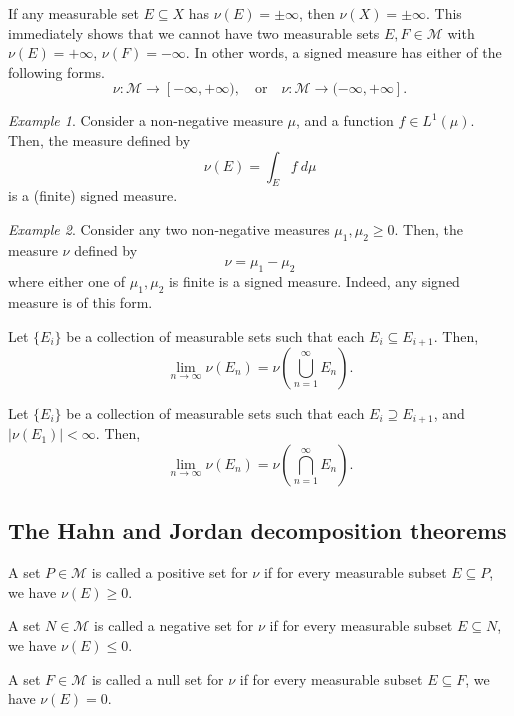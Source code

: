\documentclass[11pt]{article}
\newcommand{\M}{\mathcal{M}}
\theoremstyle{definition}
\theoremstyle{remark}
\newtheorem*{example}{Example}
\begin{document}
    \begin{corollary}
        If any measurable set $E\subseteq X$ has $\nu(E) = \pm\infty$, then $\nu(X) =
        \pm\infty$. This immediately shows that we cannot have two measurable sets
        $E, F \in \M$ with $\nu(E) = +\infty$, $\nu(F) = -\infty$. In other words, a
        signed measure has either of the following forms. \[
            \nu\colon \M \to [-\infty, +\infty), \quad\text{or}\quad
            \nu\colon \M \to (-\infty, +\infty].
        \]
    \end{corollary}

    \begin{example}
        Consider a non-negative measure $\mu$, and a function $f\in L^1(\mu)$. Then,
        the measure defined by \[
            \nu(E) = \int_E f\:d\mu
        \] is a (finite) signed measure.
    \end{example}
    \begin{example}
        Consider any two non-negative measures $\mu_1, \mu_2 \geq 0$. Then, the
        measure $\nu$ defined by \[
            \nu = \mu_1 - \mu_2
        \] where either one of $\mu_1, \mu_2$ is finite is a signed measure. Indeed,
        any signed measure is of this form.
    \end{example}

    \begin{lemma}
        Let $\{E_i\}$ be a collection of measurable sets such that each $E_i
        \subseteq E_{i + 1}$. Then, \[
            \lim_{n \to \infty} \nu(E_n) = \nu\left(\bigcup_{n = 1}^\infty
            E_n\right).
        \]
    \end{lemma}

    \begin{lemma}
        Let $\{E_i\}$ be a collection of measurable sets such that each $E_i
        \supseteq E_{i + 1}$, and $|\nu(E_1)| < \infty$. Then, \[
            \lim_{n \to \infty} \nu(E_n) = \nu\left(\bigcap_{n = 1}^\infty
            E_n\right).
        \]
    \end{lemma}

    \subsection{The Hahn and Jordan decomposition theorems}

    \begin{definition}
        A set $P \in \M$ is called a positive set for $\nu$ if for every measurable
        subset $E \subseteq P$, we have $\nu(E) \geq 0$.
    \end{definition}
    \begin{definition}
        A set $N \in \M$ is called a negative set for $\nu$ if for every measurable
        subset $E \subseteq N$, we have $\nu(E) \leq 0$.
    \end{definition}
    \begin{definition}
        A set $F \in \M$ is called a null set for $\nu$ if for every measurable
        subset $E \subseteq F$, we have $\nu(E) = 0$.
    \end{definition}
\end{document}
